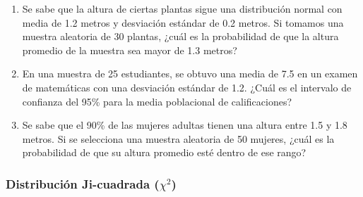 \begin{Ejer}
\begin{enumerate}
    \item Se sabe que la altura de ciertas plantas sigue una distribución normal con media de 1.2 metros y desviación estándar de 0.2 metros. Si tomamos una muestra aleatoria de 30 plantas, ¿cuál es la probabilidad de que la altura promedio de la muestra sea mayor de 1.3 metros?

    \item En una muestra de 25 estudiantes, se obtuvo una media de 7.5 en un examen de matemáticas con una desviación estándar de 1.2. ¿Cuál es el intervalo de confianza del 95\% para la media poblacional de calificaciones?

    \item Se sabe que el 90\% de las mujeres adultas tienen una altura entre 1.5 y 1.8 metros. Si se selecciona una muestra aleatoria de 50 mujeres, ¿cuál es la probabilidad de que su altura promedio esté dentro de ese rango?
\end{enumerate}
\end{Ejer}




\subsubsection{Distribución Ji-cuadrada ($\chi^2$)}

